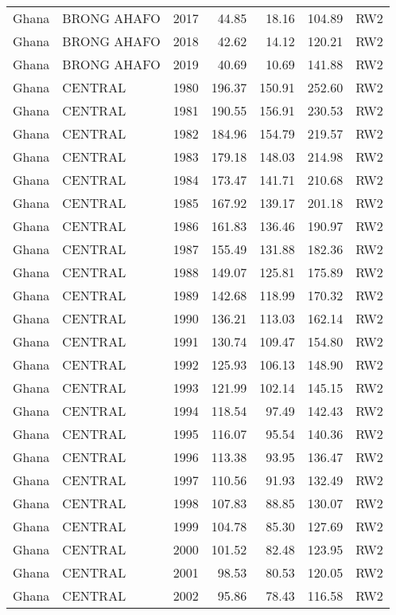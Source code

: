 \begin{longtable}{lllrrrl}
  Ghana & BRONG AHAFO & 2017 & 44.85 & 18.16 & 104.89 & RW2 \\ 
  Ghana & BRONG AHAFO & 2018 & 42.62 & 14.12 & 120.21 & RW2 \\ 
  Ghana & BRONG AHAFO & 2019 & 40.69 & 10.69 & 141.88 & RW2 \\ 
  Ghana & CENTRAL & 1980 & 196.37 & 150.91 & 252.60 & RW2 \\ 
  Ghana & CENTRAL & 1981 & 190.55 & 156.91 & 230.53 & RW2 \\ 
  Ghana & CENTRAL & 1982 & 184.96 & 154.79 & 219.57 & RW2 \\ 
  Ghana & CENTRAL & 1983 & 179.18 & 148.03 & 214.98 & RW2 \\ 
  Ghana & CENTRAL & 1984 & 173.47 & 141.71 & 210.68 & RW2 \\ 
  Ghana & CENTRAL & 1985 & 167.92 & 139.17 & 201.18 & RW2 \\ 
  Ghana & CENTRAL & 1986 & 161.83 & 136.46 & 190.97 & RW2 \\ 
  Ghana & CENTRAL & 1987 & 155.49 & 131.88 & 182.36 & RW2 \\ 
  Ghana & CENTRAL & 1988 & 149.07 & 125.81 & 175.89 & RW2 \\ 
  Ghana & CENTRAL & 1989 & 142.68 & 118.99 & 170.32 & RW2 \\ 
  Ghana & CENTRAL & 1990 & 136.21 & 113.03 & 162.14 & RW2 \\ 
  Ghana & CENTRAL & 1991 & 130.74 & 109.47 & 154.80 & RW2 \\ 
  Ghana & CENTRAL & 1992 & 125.93 & 106.13 & 148.90 & RW2 \\ 
  Ghana & CENTRAL & 1993 & 121.99 & 102.14 & 145.15 & RW2 \\ 
  Ghana & CENTRAL & 1994 & 118.54 & 97.49 & 142.43 & RW2 \\ 
  Ghana & CENTRAL & 1995 & 116.07 & 95.54 & 140.36 & RW2 \\ 
  Ghana & CENTRAL & 1996 & 113.38 & 93.95 & 136.47 & RW2 \\ 
  Ghana & CENTRAL & 1997 & 110.56 & 91.93 & 132.49 & RW2 \\ 
  Ghana & CENTRAL & 1998 & 107.83 & 88.85 & 130.07 & RW2 \\ 
  Ghana & CENTRAL & 1999 & 104.78 & 85.30 & 127.69 & RW2 \\ 
  Ghana & CENTRAL & 2000 & 101.52 & 82.48 & 123.95 & RW2 \\ 
  Ghana & CENTRAL & 2001 & 98.53 & 80.53 & 120.05 & RW2 \\ 
  Ghana & CENTRAL & 2002 & 95.86 & 78.43 & 116.58 & RW2 \\ 

\end{longtable}
